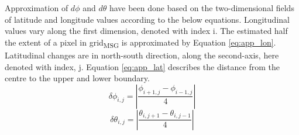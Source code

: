 Approximation of $d\phi$ and $d\theta$ have been done based on the two-dimensional fields of latitude and longitude values according to the below equations.
Longitudinal values vary along the first dimension, denoted with index i. The estimated half the extent of a pixel in grid\textsubscript{MSG} is approximated by Equation \ref{eq:app_lon}. Latitudinal changes are in north-south direction, along the second-axis, here denoted with index, j. Equation \eqref{eq:app_lat} describes the distance from the centre to the upper and lower boundary.
\begin{equation} \label{eq:app_lon}
    \delta \phi_{i,j} = \left| \frac{\phi_{i+1,j} - \phi_{i-1, j}}{4} \right|
\end{equation}
\begin{equation} \label{eq:app_lat}
    \delta \theta_{i,j} = \left| \frac{\theta_{i,j+1} - \theta_{i, j-1}}{4} \right|
\end{equation}

